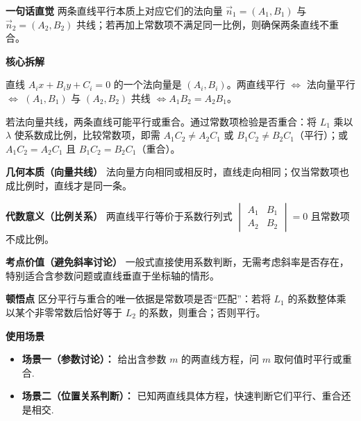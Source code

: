 \begin{explanationbox}
	\textbf{\textcolor{CExplanation}{一句话直觉}}
	两条直线平行本质上对应它们的法向量 $\vec{n}_1=(A_1,B_1)$ 与 $\vec{n}_2=(A_2,B_2)$ 共线；若再加上常数项不满足同一比例，则确保两条直线不重合。

	\medskip
	\textbf{\textcolor{CExplanation}{核心拆解}}
	\begin{description}[style=nextline, leftmargin=2.8em, labelsep=0.5em, itemsep=0.45em]
		\item[\textbf{要点一（法向量共线）：}]
			直线 $A_i x+B_i y+C_i=0$ 的一个法向量是 $(A_i,B_i)$。两直线平行 $\iff$ 法向量平行 $\iff$ $(A_1,B_1)$ 与 $(A_2,B_2)$ 共线 $\iff A_1B_2=A_2B_1$。
		\item[\textbf{要点二（区分重合）：}]
			若法向量共线，两条直线可能平行或重合。通过常数项检验是否重合：将 $L_1$ 乘以 $\lambda$ 使系数成比例，比较常数项，即需 $A_1C_2\neq A_2C_1$ 或 $B_1C_2\neq B_2C_1$（平行）；或 $A_1C_2 = A_2C_1$ 且 $B_1C_2 = B_2C_1$（重合）。
	\end{description}

	\medskip
	\textbf{\textcolor{CExplanation}{几何本质（向量共线）}}
	法向量方向相同或相反时，直线走向相同；仅当常数项也成比例时，直线才是同一条。

	\medskip
	\textbf{\textcolor{CExplanation}{代数意义（比例关系）}}
	两直线平行等价于系数行列式 $
	\begin{vmatrix}
		A_1&B_1\\A_2&B_2
	\end{vmatrix}
	=0$ 且常数项不成比例。

	\medskip
	\textbf{\textcolor{CExplanation}{考点价值（避免斜率讨论）}}
	一般式直接使用系数判断，无需考虑斜率是否存在，特别适合含参数问题或直线垂直于坐标轴的情形。

	\medskip
	\textbf{\textcolor{CExplanation}{顿悟点}}
	区分平行与重合的唯一依据是常数项是否“匹配”：若将 $L_1$ 的系数整体乘以某个非零常数后恰好等于 $L_2$ 的系数，则重合；否则平行。

	\medskip
	\textbf{\textcolor{CExplanation}{使用场景}}
	\begin{itemize}[leftmargin=*, itemsep=0.5em, topsep=0.4em]
		\item \textbf{场景一（参数讨论）：} 给出含参数 $m$ 的两直线方程，问 $m$ 取何值时平行或重合.
		\item \textbf{场景二（位置关系判断）：} 已知两直线具体方程，快速判断它们平行、重合还是相交.
	\end{itemize}

\end{explanationbox}
